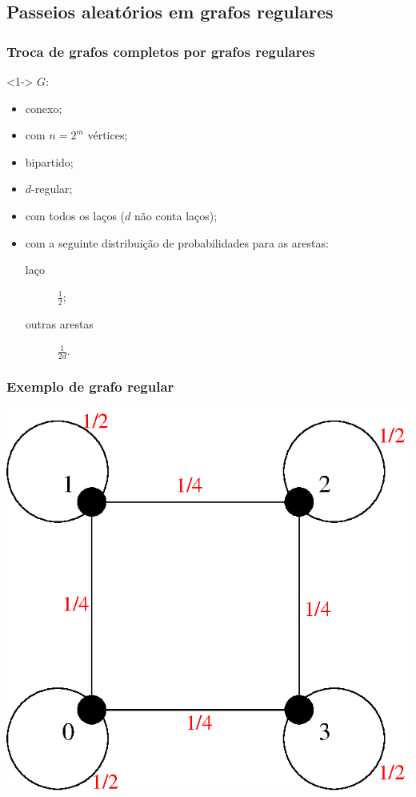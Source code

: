 \documentclass{beamer}
\theoremstyle{teoaxicorlem}
\theoremstyle{defnotnom}
\begin{document}
\subsection{Passeios aleatórios em grafos regulares}

\begin{frame}
  \frametitle{Troca de grafos completos por grafos regulares}
  \begin{block}<1->{}
    $G$:
    \begin{itemize}
    \item conexo;\pause
    \item com $n=2^m$ vértices;\pause
    \item bipartido;\pause
    \item $d$-regular;\pause
    \item com todos os laços ($d$ não conta laços);\pause
    \item com a seguinte distribuição de probabilidades para as arestas:
      \begin{description}
      \item[laço] $\frac12$;
      \item[outras arestas] $\frac1{2d}$.
      \end{description}
    \end{itemize}
  \end{block}
\end{frame}

\begin{frame}
  \frametitle{Exemplo de grafo regular}
  \begin{center}
    \noindent
    \includegraphics[height=0.8\textheight]{d2p.eps}
  \end{center}
\end{frame}
\end{document}
